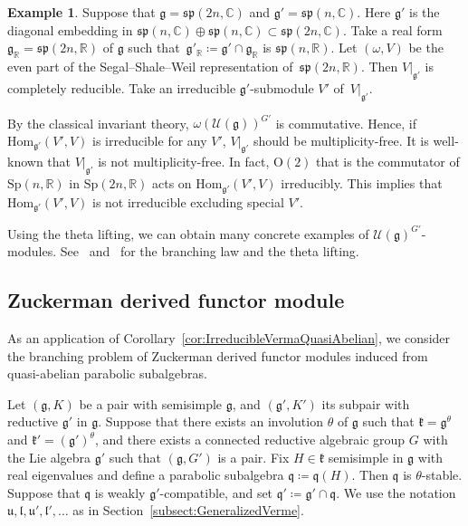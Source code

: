 \documentclass[pdftex]{sigma}
\numberwithin{equation}{section}
\theoremstyle{definition}
\newtheorem{Example}[Theorem]{Example}
\newcommand{\Hom}{\mathrm{Hom}}
\newcommand{\BasicRing}[1]{\mathbb{#1}}
\newcommand{\RR}{\BasicRing{R}}
\newcommand{\CC}{\BasicRing{C}}
\newcommand{\classicalg}[1]{\mathfrak{#1}}
\newcommand{\lieC}[1]{\mathfrak{#1}}
\newcommand{\lie}[1]{\mathfrak{#1}}
\newcommand{\univ}[1]{\mathcal{U}(\lieC{#1})}
\newcommand{\lieSp}{\classicalg{sp}}
\begin{document}
\begin{Example}\label{ex:NonIrreducible}
	Suppose that $\lie{g} = \lieSp(2n,\CC)$ and $\lie{g'} = \lieSp(n, \CC)$.
	Here $\lie{g'}$ is the diagonal embedding in $\lieSp(n,\CC)\oplus \lieSp(n, \CC) \subset \lieSp(2n,\CC)$.
	Take a real form $\lie{g}_\RR = \lieSp(2n,\RR)$ of $\lie{g}$ such that~${\lie{g}'_\RR \coloneq \lie{g'}\cap \lie{g}_\RR}$ is $\lieSp(n,\RR)$.
	Let $(\omega, V)$ be the even part of the Segal--Shale--Weil representation of~$\lieSp(2n,\RR)$.
	Then $V|_{\lie{g'}}$ is completely reducible.
	Take an irreducible $\lie{g'}$-submodule $V'$ of~$V|_{\lie{g'}}$.

	By the classical invariant theory, $\omega(\univ{g})^{G'}$ is commutative.
	Hence, if $\Hom_{\lie{g'}}(V', V)$ is irreducible for any $V'$, $V|_{\lie{g'}}$ should be multiplicity-free.
	It is well-known that $V|_{\lie{g'}}$ is not multiplicity-free.
	In fact, $\mathrm{O}(2)$ that is the commutator of $\mathrm{Sp}(n,\RR)$ in $\mathrm{Sp}(2n,\RR)$ acts on $\Hom_{\lie{g'}}(V', V)$ irreducibly.
	This implies that $\Hom_{\lie{g'}}(V', V)$ is not irreducible excluding special $V'$.
	
	Using the theta lifting, we can obtain many concrete examples of $\univ{g}^{G'}$-modules.
	See~\cite{KaVe78} and~\cite{Ho89} for the branching law and the theta lifting.
\end{Example}

\subsection{Zuckerman derived functor module}

As an application of Corollary~\ref{cor:IrreducibleVermaQuasiAbelian},
we consider the branching problem of Zuckerman derived functor modules induced from
quasi-abelian parabolic subalgebras.

Let $(\lie{g}, K)$ be a pair with semisimple $\lie{g}$, and $(\lie{g'}, K')$ its subpair with reductive $\lie{g'}$ in $\lie{g}$.
Suppose that there exists an involution $\theta$ of $\lie{g}$ such that $\lie{k} = \lie{g}^\theta$ and $\lie{k'} = (\lie{g'})^\theta$,
and there exists a connected reductive algebraic group $G$ with the Lie algebra $\lie{g'}$ such that $(\lie{g}, G')$ is a pair.
Fix $H \in \lie{k}$ semisimple in $\lie{g}$ with real eigenvalues
and define a parabolic subalgebra $\lie{q}\coloneq \lie{q}(H)$.
Then $\lie{q}$ is $\theta$-stable.
Suppose that $\lie{q}$ is weakly $\lie{g'}$-compatible, and set $\lie{q'}\coloneq \lie{g'}\cap \lie{q}$.
We use the notation $\lie{u}, \lie{l}, \lie{u'}, \lie{l'}, \ldots$ as in Section~\ref{subsect:GeneralizedVerme}.
\end{document}
